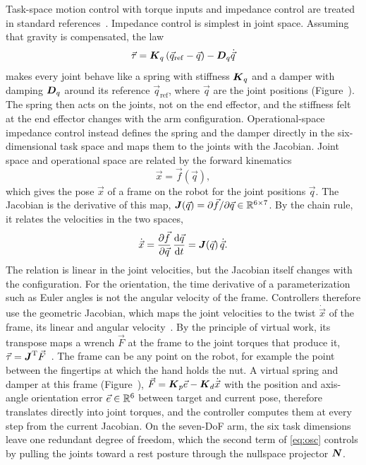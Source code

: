 Task-space motion control with torque inputs and impedance control are treated in standard references~\cite{Lynch2017,Chung2016,Villani2016}. Impedance control is simplest in joint space. Assuming that gravity is compensated, the law
\begin{equation}\label{eq:joint-impedance}
  \vec{\tau}=\boldsymbol{K}_{q}\left(\vec{q}_{\mathrm{ref}}-\vec{q}\right)-\boldsymbol{D}_{q}\dot{\vec{q}}
\end{equation}
makes every joint behave like a spring with stiffness $\boldsymbol{K}_{q}$ and a damper with damping $\boldsymbol{D}_{q}$ around its reference $\vec{q}_{\mathrm{ref}}$, where $\vec{q}$ are the joint positions (Figure~). The spring then acts on the joints, not on the end effector, and the stiffness felt at the end effector changes with the arm configuration. Operational-space impedance control instead defines the spring and the damper directly in the six-dimensional task space and maps them to the joints with the Jacobian. Joint space and operational space are related by the forward kinematics
\begin{equation}\label{eq:fk}
  \vec{x}=\vec{f}(\vec{q}),
\end{equation}
which gives the pose $\vec{x}$ of a frame on the robot for the joint positions $\vec{q}$. The Jacobian is the derivative of this map, $\boldsymbol{J}(\vec{q})=\partial\vec{f}/\partial\vec{q}\in\mathbb{R}^{6\times7}$. By the chain rule, it relates the velocities in the two spaces,
\begin{equation}\label{eq:jacobian}
  \dot{\vec{x}}=\frac{\partial\vec{f}}{\partial\vec{q}}\,\frac{\mathrm{d}\vec{q}}{\mathrm{d}t}=\boldsymbol{J}(\vec{q})\,\dot{\vec{q}}.
\end{equation}
The relation is linear in the joint velocities, but the Jacobian itself changes with the configuration. For the orientation, the time derivative of a parameterization such as Euler angles is not the angular velocity of the frame. Controllers therefore use the geometric Jacobian, which maps the joint velocities to the twist $\dot{\vec{x}}$ of the frame, its linear and angular velocity~\cite{Lynch2017}. By the principle of virtual work, its transpose maps a wrench $\vec{F}$ at the frame to the joint torques that produce it, $\vec{\tau}=\boldsymbol{J}^{\mathrm{T}}\vec{F}$~\cite{Lynch2017}. The frame can be any point on the robot, for example the point between the fingertips at which the hand holds the nut. A virtual spring and damper at this frame (Figure~), $\vec{F}=\boldsymbol{K}_p\vec{e}-\boldsymbol{K}_d\dot{\vec{x}}$ with the position and axis-angle orientation error $\vec{e}\in\mathbb{R}^6$ between target and current pose, therefore translates directly into joint torques, and the controller computes them at every step from the current Jacobian. On the seven-DoF arm, the six task dimensions leave one redundant degree of freedom, which the second term of \eqref{eq:osc} controls by pulling the joints toward a rest posture through the nullspace projector $\boldsymbol{N}$.

